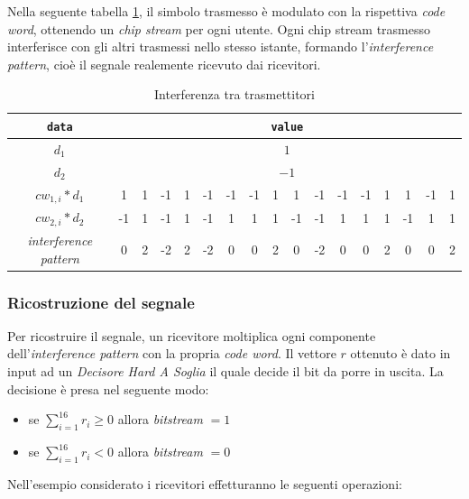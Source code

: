 \documentclass[a4paper,12pt]{article}
\begin{document}
    Nella seguente tabella \ref{tab:interference pattern}, il simbolo trasmesso è modulato con la rispettiva \textit{code word}, ottenendo un
    \textit{chip stream} per ogni utente. Ogni chip stream trasmesso interferisce con gli altri trasmessi nello stesso 
    istante, formando l'\textit{interference pattern}, cioè il segnale realemente ricevuto dai ricevitori.

    \begin{table}[H]
      \centering
      \begin{tabular}{| c | c | c | c | c | c | c | c | c | c | c | c | c | c | c | c | c |}\hline
        \texttt{data} & \multicolumn{16}{|c|}{\texttt{value}} \\ \hline
        $d_1$ & \multicolumn{16}{|c|}{$1$} \\ \hline
        $d_2$ & \multicolumn{16}{|c|}{$-1$}\\ \hline
        $cw_{1,i} * d_1$ &1&1&-1&1&-1&-1&-1&1&1&-1&-1&-1&1&1&-1&1 \\ \hline
        $cw_{2,i} * d_2$ &-1&1&-1&1&-1&1&1&1&-1&-1&1&1&1&-1&1&1 \\ \hline
        \textit{interference pattern} &0&2&-2&2&-2&0&0&2&0&-2&0&0&2&0&0&2 \\ \hline
      \end{tabular}
      \caption{Interferenza tra trasmettitori}
      \label{tab:interference pattern}
    \end{table}

    \subsubsection{Ricostruzione del segnale}\label{ricostruzione}
    Per ricostruire il segnale, un ricevitore moltiplica ogni componente dell'\textit{interference pattern} con la propria \textit{code
    word}. Il vettore $r$ ottenuto è dato in input ad un \textit{Decisore Hard A Soglia} il quale decide il bit da porre in 
    uscita. La decisione è presa nel seguente modo:

    \begin{itemize}
      \item se $\sum\limits_{i=1}^{16} r_i \geq 0 $ allora \textit{bitstream} $= 1$
      \item se $\sum\limits_{i=1}^{16} r_i < 0 $ allora \textit{bitstream} $= 0$
    \end{itemize}

    Nell'esempio considerato i ricevitori effetturanno le seguenti operazioni:
\end{document}

